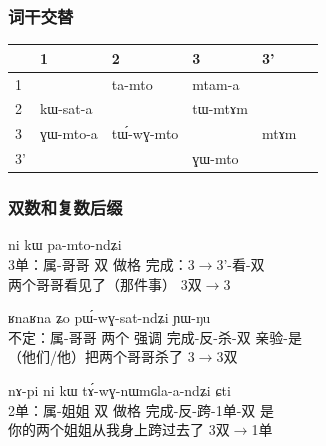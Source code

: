 \documentclass[xcolor=table]{beamer}
\newcommand{\ipa}[1]{{\phon \mbox{#1}}} %
\newcommand{\grise}[1]{\cellcolor{lightgray}\textbf{#1}}
\newcommand{\bleu}[1]{{\color{blue}#1}}
\newcommand{\rouge}[1]{{\color{red}#1}}
\newcommand{\marque}[1]{\color{blue}#1}
\begin{document}
          
 \begin{frame} 
 \frametitle{词干交替}      
     
     \centering
 \begin{tabular}{llllll}
&     1 & 2 & 3 &3'\\
\toprule
 1 &\grise{} &\ipa{ta-mto} & \ipa{\bleu{mtam}-a}\\  
 2 &\ipa{kɯ-sat-a}&\grise{}  &  \ipa{tɯ-\bleu{mtɤm}}\\  
 3 & \ipa{\rouge{ɣɯ}-mto-a}&  \ipa{tɯ́-\rouge{wɣ}-mto}&\grise{}   &\ipa{\bleu{mtɤm}} \\
  3'&  &&  \ipa{\rouge{ɣɯ}-mto}\\
  \bottomrule
\end{tabular}
     
\end{frame}    

    \begin{frame} 
 \frametitle{双数和复数后缀}      

\begin{exe}
\ex 
\gll \ipa{ɯ-pi} 	\ipa{ni} 	\ipa{kɯ} 	\ipa{pa-mto-ndʑi}  \\
3单：属-哥哥 双 做格 完成：3$\rightarrow$3'-看-双 \\
\glt 两个哥哥看见了（那件事） \marque{3双$\rightarrow$3}
\end{exe}

\begin{exe}
\ex 
\gll \ipa{tɤ-pi} 	\ipa{ʁnaʁna} 	\ipa{ʑo} 	\ipa{pɯ́-wɣ-sat-ndʑi} 	\ipa{ɲɯ-ŋu} \\
不定：属-哥哥 两个 强调 完成-反-杀-双 亲验-是 \\
\glt （他们/他）把两个哥哥杀了 \marque{3$\rightarrow$3双}
\end{exe}

\begin{exe}
\ex 
\gll
\ipa{nɤ-pi} 	\ipa{ni} 	\ipa{kɯ} 	\ipa{tɤ́-wɣ-nɯmɢla-a-ndʑi} 	\ipa{ɕti} \\
2单：属-姐姐 双 做格 完成-反-跨-1单-双 是 \\
\glt 你的两个姐姐从我身上跨过去了 \marque{3双$\rightarrow$1单}
\end{exe}


\end{frame}    
\end{document}
